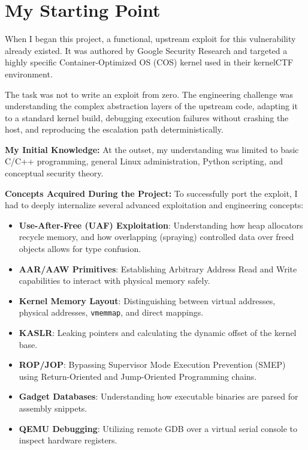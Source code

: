 \documentclass[11pt,a4paper]{article}
\begin{document}
\clearpage

\section{My Starting Point}
When I began this project, a functional, upstream exploit for this vulnerability already existed. It was authored by Google Security Research and targeted a highly specific Container-Optimized OS (COS) kernel used in their kernelCTF environment. 

The task was not to write an exploit from zero. The engineering challenge was understanding the complex abstraction layers of the upstream code, adapting it to a standard kernel build, debugging execution failures without crashing the host, and reproducing the escalation path deterministically. 

\textbf{My Initial Knowledge:}
At the outset, my understanding was limited to basic C/C++ programming, general Linux administration, Python scripting, and conceptual security theory. 

\textbf{Concepts Acquired During the Project:}
To successfully port the exploit, I had to deeply internalize several advanced exploitation and engineering concepts:
\begin{itemize}
    \item \textbf{Use-After-Free (UAF) Exploitation}: Understanding how heap allocators recycle memory, and how overlapping (spraying) controlled data over freed objects allows for type confusion.
    \item \textbf{AAR/AAW Primitives}: Establishing Arbitrary Address Read and Write capabilities to interact with physical memory safely.
    \item \textbf{Kernel Memory Layout}: Distinguishing between virtual addresses, physical addresses, \texttt{vmemmap}, and direct mappings.
    \item \textbf{KASLR}: Leaking pointers and calculating the dynamic offset of the kernel base.
    \item \textbf{ROP/JOP}: Bypassing Supervisor Mode Execution Prevention (SMEP) using Return-Oriented and Jump-Oriented Programming chains.
    \item \textbf{Gadget Databases}: Understanding how executable binaries are parsed for assembly snippets.
    \item \textbf{QEMU Debugging}: Utilizing remote GDB over a virtual serial console to inspect hardware registers.
\end{itemize}
\end{document}
